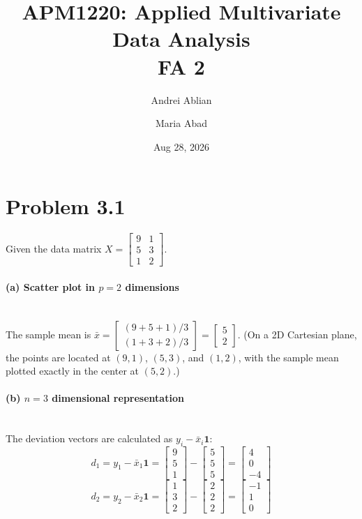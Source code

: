 \documentclass[12pt]{article}
\title{APM1220: Applied Multivariate Data Analysis \\ FA 2}
\author{
Andrei Ablian \\
\and
Maria Abad}
\date{Aug 28, 2026}
\begin{document}
\maketitle

\section*{Problem 3.1} 
Given the data matrix $X = \begin{bmatrix} 9 & 1 \\ 5 & 3 \\ 1 & 2 \end{bmatrix}$.

\paragraph{(a) Scatter plot in $p=2$ dimensions} \mbox{} \\
The sample mean is $\bar{x} = \begin{bmatrix} (9+5+1)/3 \\ (1+3+2)/3 \end{bmatrix} = \begin{bmatrix} 5 \\ 2 \end{bmatrix}$. 
(On a 2D Cartesian plane, the points are located at $(9,1)$, $(5,3)$, and $(1,2)$, with the sample mean plotted exactly in the center at $(5,2)$.)

\paragraph{(b) $n=3$ dimensional representation} \mbox{} \\
The deviation vectors are calculated as $y_i - \bar{x}_i \mathbf{1}$:
\[
d_1 = y_1 - \bar{x}_1 \mathbf{1} = \begin{bmatrix} 9 \\ 5 \\ 1 \end{bmatrix} - \begin{bmatrix} 5 \\ 5 \\ 5 \end{bmatrix} = \begin{bmatrix} 4 \\ 0 \\ -4 \end{bmatrix}
\]
\[
d_2 = y_2 - \bar{x}_2 \mathbf{1} = \begin{bmatrix} 1 \\ 3 \\ 2 \end{bmatrix} - \begin{bmatrix} 2 \\ 2 \\ 2 \end{bmatrix} = \begin{bmatrix} -1 \\ 1 \\ 0 \end{bmatrix}
\]
\end{document}

